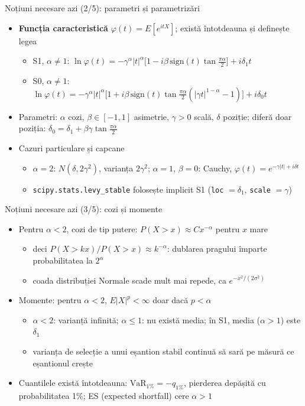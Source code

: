 \begin{frame}{Noțiuni necesare azi (2/5): parametri și parametrizări}
\itemsize{\small}
\begin{itemize}
    \item \textbf{Funcția caracteristică} $\varphi(t) = E[e^{itX}]$; există întotdeauna și definește legea
    \begin{itemize}
        \item S1, $\alpha \ne 1$: $\ln\varphi(t) = -\gamma^\alpha|t|^\alpha\big[1 - i\beta\,\mathrm{sign}(t)\tan\frac{\pi\alpha}{2}\big] + i\delta_1 t$
        \item S0, $\alpha \ne 1$: $\ln\varphi(t) = -\gamma^\alpha|t|^\alpha\big[1 + i\beta\,\mathrm{sign}(t)\tan\frac{\pi\alpha}{2}(|\gamma t|^{1-\alpha} - 1)\big] + i\delta_0 t$
    \end{itemize}
    \item Parametri: $\alpha$ cozi, $\beta \in [-1, 1]$ asimetrie, $\gamma > 0$ scală, $\delta$ poziție; diferă doar poziția: $\delta_0 = \delta_1 + \beta\gamma\tan\frac{\pi\alpha}{2}$
    \item Cazuri particulare și capcane
    \begin{itemize}
        \item $\alpha = 2$: $N(\delta, 2\gamma^2)$, varianța $2\gamma^2$; $\alpha = 1$, $\beta = 0$: Cauchy, $\varphi(t) = e^{-\gamma|t| + i\delta t}$
        \item \texttt{scipy.stats.levy\_stable} folosește implicit S1 (\texttt{loc} $= \delta_1$, \texttt{scale} $= \gamma$)
    \end{itemize}
\end{itemize}
\end{frame}

\begin{frame}{Noțiuni necesare azi (3/5): cozi și momente}
\itemsize{\small}
\begin{itemize}
    \item Pentru $\alpha < 2$, cozi de tip putere: $P(X > x) \approx C x^{-\alpha}$ pentru $x$ mare
    \begin{itemize}
        \item deci $P(X > kx)/P(X > x) \approx k^{-\alpha}$: dublarea pragului împarte probabilitatea la $2^\alpha$
        \item coada distribuției Normale scade mult mai repede, ca $e^{-x^2/(2\sigma^2)}$
    \end{itemize}
    \item Momente: pentru $\alpha < 2$, $E|X|^p < \infty$ doar dacă $p < \alpha$
    \begin{itemize}
        \item $\alpha < 2$: varianță infinită; $\alpha \le 1$: nu există media; în S1, media ($\alpha > 1$) este $\delta_1$
        \item varianța de selecție a unui eșantion stabil continuă să sară pe măsură ce eșantionul crește
    \end{itemize}
    \item Cuantilele există întotdeauna: $\mathrm{VaR}_{1\%} = -q_{1\%}$, pierderea depășită cu probabilitatea 1\%; ES (expected shortfall) cere $\alpha > 1$
\end{itemize}
\end{frame}

